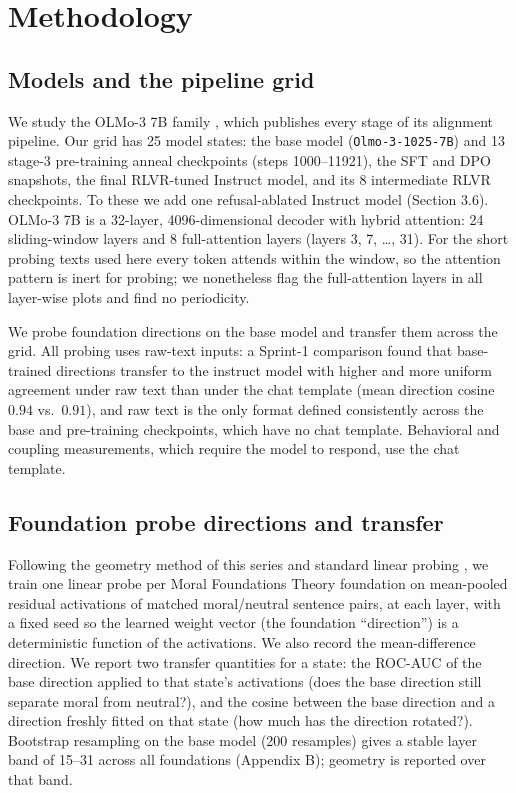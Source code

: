\section{Methodology}\label{methodology}

\subsection{Models and the pipeline grid}\label{models-and-the-pipeline-grid}

We study the OLMo-3 7B family \citep{olmo3_2025}, which publishes every stage of
its alignment pipeline. Our grid has 25 model states: the base model
(\texttt{Olmo-3-1025-7B}) and 13 stage-3 pre-training anneal checkpoints (steps
1000--11921), the SFT and DPO snapshots, the final RLVR-tuned Instruct model,
and its 8 intermediate RLVR checkpoints. To these we add one refusal-ablated
Instruct model (Section 3.6). OLMo-3 7B is a 32-layer, 4096-dimensional decoder
with hybrid attention: 24 sliding-window layers and 8 full-attention layers
(layers 3, 7, \dots, 31). For the short probing texts used here every token
attends within the window, so the attention pattern is inert for probing; we
nonetheless flag the full-attention layers in all layer-wise plots and find no
periodicity.

We probe foundation directions on the base model and transfer them across the
grid. All probing uses raw-text inputs: a Sprint-1 comparison found that
base-trained directions transfer to the instruct model with higher and more
uniform agreement under raw text than under the chat template (mean
direction cosine \(0.94\) vs.~\(0.91\)), and raw text is the only format defined
consistently across the base and pre-training checkpoints, which have no chat
template. Behavioral and coupling measurements, which require the model to
respond, use the chat template.

\subsection{Foundation probe directions and transfer}\label{foundation-probe-directions-and-transfer}

Following the geometry method of this series \citep{reblitzrichardson2026geometry}
and standard linear probing \citep{alain2017probes}, we train one linear probe
per Moral Foundations Theory \citep{haidt2012righteous, graham2013mft}
foundation on mean-pooled residual activations of matched moral/neutral sentence
pairs, at each layer, with a fixed seed so the learned weight vector (the
foundation ``direction'') is a deterministic function of the activations. We also
record the mean-difference direction. We report two transfer quantities for a
state: the ROC-AUC of the base direction applied to that state's activations
(does the base direction still separate moral from neutral?), and the cosine
between the base direction and a direction freshly fitted on that state (how
much has the direction rotated?). Bootstrap resampling on the base model
(200 resamples) gives a stable layer band of 15--31 across all foundations
(Appendix B); geometry is reported over that band.

